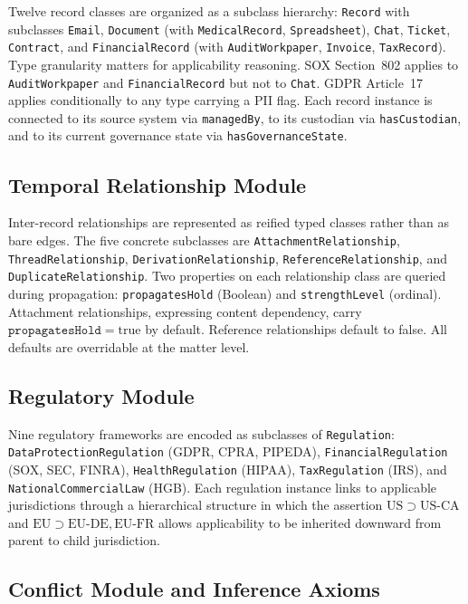 \documentclass{ieeeaccess}
\begin{document}
Twelve record classes are organized as a subclass hierarchy: \texttt{Record} with subclasses \texttt{Email}, \texttt{Document} (with \texttt{MedicalRecord}, \texttt{Spreadsheet}), \texttt{Chat}, \texttt{Ticket}, \texttt{Contract}, and \texttt{FinancialRecord} (with \texttt{AuditWorkpaper}, \texttt{Invoice}, \texttt{TaxRecord}). Type granularity matters for applicability reasoning. SOX Section~802 applies to \texttt{AuditWorkpaper} and \texttt{FinancialRecord} but not to \texttt{Chat}. GDPR Article~17 applies conditionally to any type carrying a PII flag. Each record instance is connected to its source system via \texttt{managedBy}, to its custodian via \texttt{hasCustodian}, and to its current governance state via \texttt{hasGovernanceState}.

\subsection{Temporal Relationship Module}

Inter-record relationships are represented as reified typed classes rather than as bare edges. The five concrete subclasses are \texttt{AttachmentRelationship}, \texttt{ThreadRelationship}, \texttt{DerivationRelationship}, \texttt{ReferenceRelationship}, and \texttt{DuplicateRelationship}. Two properties on each relationship class are queried during propagation: \texttt{propagatesHold} (Boolean) and \texttt{strengthLevel} (ordinal). Attachment relationships, expressing content dependency, carry $\texttt{propagatesHold} = \mathrm{true}$ by default. Reference relationships default to false. All defaults are overridable at the matter level.

\subsection{Regulatory Module}

Nine regulatory frameworks are encoded as subclasses of \texttt{Regulation}: \texttt{DataProtectionRegulation} (GDPR, CPRA, PIPEDA), \texttt{FinancialRegulation} (SOX, SEC, FINRA), \texttt{HealthRegulation} (HIPAA), \texttt{TaxRegulation} (IRS), and \texttt{NationalCommercialLaw} (HGB). Each regulation instance links to applicable jurisdictions through a hierarchical structure in which the assertion $\mathrm{US} \supset \mathrm{US\text{-}CA}$ and $\mathrm{EU} \supset \mathrm{EU\text{-}DE}, \mathrm{EU\text{-}FR}$ allows applicability to be inherited downward from parent to child jurisdiction.

\subsection{Conflict Module and Inference Axioms}
\end{document}

